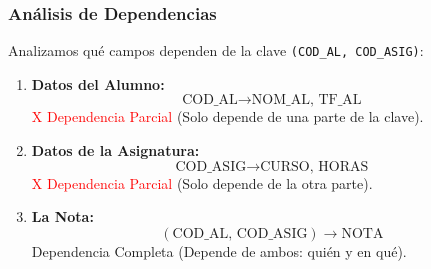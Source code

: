 \documentclass{beamer}
\begin{document}
\begin{frame}
  \frametitle{Análisis de Dependencias}

  Analizamos qué campos dependen de la clave \texttt{(COD\_AL, COD\_ASIG)}:

  \begin{enumerate}
      \item \textbf{Datos del Alumno:}
      $$ \text{COD\_AL} \to \text{NOM\_AL, TF\_AL} $$
      \textcolor{red}{X Dependencia Parcial} (Solo depende de una parte de la clave).

      \item \textbf{Datos de la Asignatura:}
      $$ \text{COD\_ASIG} \to \text{CURSO, HORAS} $$
      \textcolor{red}{X Dependencia Parcial} (Solo depende de la otra parte).

      \item \textbf{La Nota:}
      $$ (\text{COD\_AL, COD\_ASIG}) \to \text{NOTA} $$
      \textcolor{mygreen}{\checkmark Dependencia Completa} (Depende de ambos: quién y en qué).
  \end{enumerate}
\end{frame}
\end{document}
